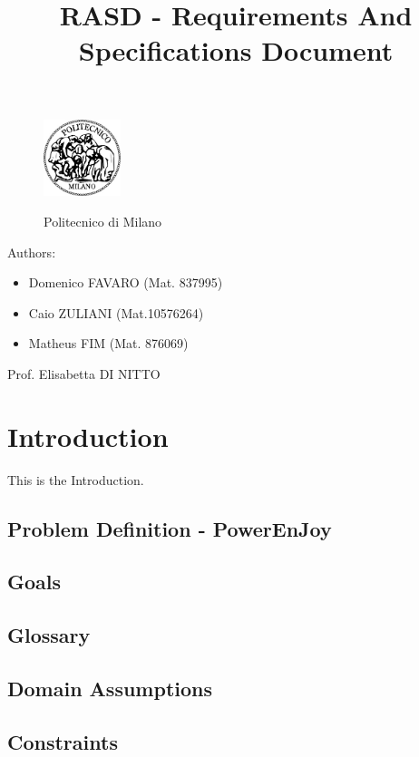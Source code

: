 \documentclass[a4paper]{article}
\title{RASD - Requirements And Specifications Document}
\begin{document}
\begin{titlepage}
\begin{figure}
\centering
\includegraphics[width=0.2\textwidth]{polimi.jpg}
\par
\LARGE Politecnico di Milano
\end{figure}


\maketitle
\raggedright
Authors:
\begin{itemize}
	\item Domenico FAVARO (Mat. 837995)
	\item Caio ZULIANI (Mat.10576264)
	\item Matheus FIM (Mat. 876069)
\end{itemize}
\raggedleft
Prof. Elisabetta DI NITTO
\thispagestyle{empty}
\end{titlepage}

\tableofcontents
\newpage
 
\section{Introduction}
 
This is the Introduction.
\subsection{Problem Definition - PowerEnJoy}
\subsection{Goals}
\subsection{Glossary}
\subsection{Domain Assumptions}
\subsection{Constraints}
\end{document}
